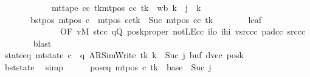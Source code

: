 \begin{isabellebody}
\ \ \ \ \ \ \ \ \ \ \ \ {\isacharparenleft}{\kern0pt}mt{\isacharunderscore}{\kern0pt}tape\ cc\ tk{\isacharparenright}{\kern0pt}{\isacharparenleft}{\kern0pt}mt{\isacharunderscore}{\kern0pt}pos\ cc\ tk\ {\isacharcolon}{\kern0pt}{\isacharequal}{\kern0pt}\ {\isacharquery}{\kern0pt}wb\ {\isacharparenleft}{\kern0pt}{\isacharquery}{\kern0pt}k\ {\isacharplus}{\kern0pt}\ j\ {\isacharminus}{\kern0pt}\ {\isacharquery}{\kern0pt}k{\isacharparenright}{\kern0pt}{\isacharparenright}{\kern0pt}{\isacharparenright}{\kern0pt}{\isachardoublequoteclose}\isanewline
\ \ \ \ \ \ \ bst{\isacharunderscore}{\kern0pt}pos{\isacharcolon}{\kern0pt}\ {\isachardoublequoteopen}mt{\isacharunderscore}{\kern0pt}pos\ c{\isacharprime}{\kern0pt}{\isacharprime}{\kern0pt}\ {\isacharequal}{\kern0pt}\ {\isacharparenleft}{\kern0pt}mt{\isacharunderscore}{\kern0pt}pos\ cc{\isacharparenright}{\kern0pt}{\isacharparenleft}{\kern0pt}tk\ {\isacharcolon}{\kern0pt}{\isacharequal}{\kern0pt}\ Suc\ {\isacharparenleft}{\kern0pt}mt{\isacharunderscore}{\kern0pt}pos\ cc\ tk{\isacharparenright}{\kern0pt}{\isacharparenright}{\kern0pt}{\isachardoublequoteclose}\isanewline
\ \ \ \ \ \ \isamarkupfalse%
\ leaf\isanewline
\ \ \ \ \ \ \ \ \ \ \ \ \ \ {\isacharbrackleft}{\kern0pt}OF\ vM\ st{\isacharunderscore}{\kern0pt}cc\ qQ\ poskproper\ notLE{\isacharunderscore}{\kern0pt}cc\ ilo\ ihi\ vsrc{\isacharunderscore}{\kern0pt}cc\ pad{\isacharunderscore}{\kern0pt}cc\ src{\isacharunderscore}{\kern0pt}cc{\isacharbrackright}{\kern0pt}\isanewline
\ \ \ \ \ \ \isamarkupfalse%
\ blast\isanewline
\ \ \ \ \isamarkupfalse%
\ state{\isacharunderscore}{\kern0pt}eq{\isacharcolon}{\kern0pt}\ {\isachardoublequoteopen}mt{\isacharunderscore}{\kern0pt}state\ c{\isacharprime}{\kern0pt}{\isacharprime}{\kern0pt}\ {\isacharequal}{\kern0pt}\ {\isacharparenleft}{\kern0pt}q{\isacharcomma}{\kern0pt}\ AR{\isacharunderscore}{\kern0pt}SimWrite{\isacharcomma}{\kern0pt}\ tk{\isacharcomma}{\kern0pt}\ {\isacharquery}{\kern0pt}k\ {\isacharplus}{\kern0pt}\ Suc\ j{\isacharcomma}{\kern0pt}\ buf{\isacharcomma}{\kern0pt}\ dvec{\isacharcomma}{\kern0pt}\ posk{\isacharparenright}{\kern0pt}{\isachardoublequoteclose}\isanewline
\ \ \ \ \ \ \isamarkupfalse%
\ bst{\isacharunderscore}{\kern0pt}state\ \isamarkupfalse%
\ simp\isanewline
\ \ \ \ \isamarkupfalse%
\ pos{\isacharunderscore}{\kern0pt}eq{\isacharcolon}{\kern0pt}\ {\isachardoublequoteopen}mt{\isacharunderscore}{\kern0pt}pos\ c{\isacharprime}{\kern0pt}{\isacharprime}{\kern0pt}\ tk\ {\isacharequal}{\kern0pt}\ base\ {\isacharplus}{\kern0pt}\ Suc\ j{\isachardoublequoteclose}\isanewline

\end{isabellebody}
